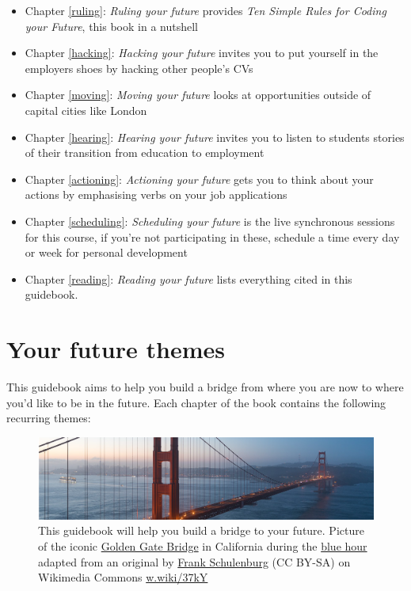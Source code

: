 \documentclass[
]{book}
\providecommand{\tightlist}{%
  \setlength{\itemsep}{0pt}\setlength{\parskip}{0pt}}
\begin{document}
\begin{itemize}
\tightlist
\item
  Chapter \ref{ruling}: \emph{Ruling your future} provides \emph{Ten Simple Rules for Coding your Future}, this book in a nutshell
\item
  Chapter \ref{hacking}: \emph{Hacking your future} invites you to put yourself in the employers shoes by hacking other people's CVs
\item
  Chapter \ref{moving}: \emph{Moving your future} looks at opportunities outside of capital cities like London
\item
  Chapter \ref{hearing}: \emph{Hearing your future} invites you to listen to students stories of their transition from education to employment
\item
  Chapter \ref{actioning}: \emph{Actioning your future} gets you to think about your actions by emphasising verbs on your job applications
\item
  Chapter \ref{scheduling}: \emph{Scheduling your future} is the live synchronous sessions for this course, if you're not participating in these, schedule a time every day or week for personal development
\item
  Chapter \ref{reading}: \emph{Reading your future} lists everything cited in this guidebook.
\end{itemize}

\hypertarget{themes}{%
\section{Your future themes}\label{themes}}

This guidebook aims to help you build a bridge from where you are now to where you'd like to be in the future. Each chapter of the book contains the following recurring themes:

\begin{figure}

{\centering \includegraphics[width=1\linewidth]{images/goldengate} 

}

\caption{This guidebook will help you build a bridge to your future. Picture of the iconic \href{https://en.wikipedia.org/wiki/Golden_Gate_Bridge}{Golden Gate Bridge} in California during the \href{https://en.wikipedia.org/wiki/Blue_hour}{blue hour} adapted from an original by \href{https://commons.wikimedia.org/wiki/User:Frank_Schulenburg}{Frank Schulenburg} (CC BY-SA) on Wikimedia Commons \href{https://w.wiki/37kY}{w.wiki/37kY}}\label{fig:goldengate-fig}
\end{figure}
\end{document}
